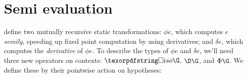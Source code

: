 \documentclass{rntz}\usepackage{fantasy}%
\begin{document}


\section{Semi\naive{} evaluation}
\label{sec:seminaive}

\renewcommand\isocx\isof


 define two mutually recursive
static transformations: $\phi e$, which computes $e$ \emph{semi\naive{}ly},
speeding up fixed point computation by using derivatives; and $\delta e$, which
computes the \emph{derivative} of $\phi e$.
%
To describe the types of $\phi e$ and $\delta e$, we'll need three new operators
on contexts: $\isocx\G$, $\D\G$, and $\Phi\G$.
%
We define these by their pointwise action on hypotheses:
\end{document}
